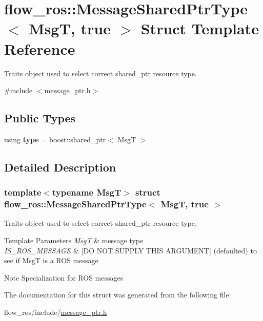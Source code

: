 \hypertarget{structflow__ros_1_1_message_shared_ptr_type_3_01_msg_t_00_01true_01_4}{}\section{flow\+\_\+ros\+:\+:Message\+Shared\+Ptr\+Type$<$ MsgT, true $>$ Struct Template Reference}
\label{structflow__ros_1_1_message_shared_ptr_type_3_01_msg_t_00_01true_01_4}


Traits object used to select correct shared\+\_\+ptr resource type.  




{\ttfamily \#include $<$message\+\_\+ptr.\+h$>$}

\subsection*{Public Types}
\begin{DoxyCompactItemize}
\item 
\mbox{\label{structflow__ros_1_1_message_shared_ptr_type_3_01_msg_t_00_01true_01_4_a748eb553b42c2c7b1acdcc09c04c1c83}} 
using {\bfseries type} = boost\+::shared\+\_\+ptr$<$ MsgT $>$
\end{DoxyCompactItemize}


\subsection{Detailed Description}
\subsubsection*{template$<$typename MsgT$>$\newline
struct flow\+\_\+ros\+::\+Message\+Shared\+Ptr\+Type$<$ Msg\+T, true $>$}

Traits object used to select correct shared\+\_\+ptr resource type. 


\begin{DoxyTemplParams}{Template Parameters}
{\em MsgT} & message type \\
\hline
{\em I\+S\+\_\+\+R\+O\+S\+\_\+\+M\+E\+S\+S\+A\+GE} & \mbox{[}DO N\+OT S\+U\+P\+P\+LY T\+H\+IS A\+R\+G\+U\+M\+E\+NT\mbox{]} (defaulted) to see if MsgT is a R\+OS message \\
\hline
\end{DoxyTemplParams}
\begin{DoxyNote}{Note}
Specialization for R\+OS messages 
\end{DoxyNote}


The documentation for this struct was generated from the following file\+:\begin{DoxyCompactItemize}
\item 
flow\+\_\+ros/include/\hyperlink{message__ptr_8h}{message\+\_\+ptr.\+h}\end{DoxyCompactItemize}
